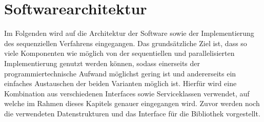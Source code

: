 \section{Softwarearchitektur}
Im Folgenden wird auf die Architektur der Software sowie der Implementierung des sequenziellen Verfahrens eingegangen. Das grundsätzliche Ziel ist, dass so viele Komponenten wie möglich von der sequentiellen und parallelisierten Implementierung genutzt werden können, sodass einerseits der programmiertechnische Aufwand möglichst gering ist und andererseits ein einfaches Austauschen der beiden Varianten möglich ist. Hierfür wird eine Kombination aus verschiedenen Interfaces sowie Serviceklassen verwendet, auf welche im Rahmen dieses Kapitels genauer eingegangen wird. Zuvor werden noch die verwendeten Datenstrukturen und das Interface für die Bibliothek vorgestellt.
 
